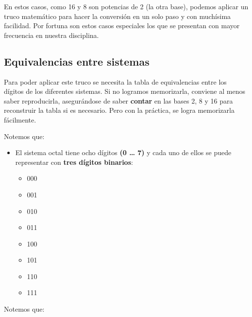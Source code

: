 \documentclass[spanish,a4paper,]{article}
\providecommand{\tightlist}{%
  \setlength{\itemsep}{0pt}\setlength{\parskip}{0pt}}
\begin{document}
En estos casos, como 16 y 8 son potencias de 2 (la otra base), podemos
aplicar un truco matemático para hacer la conversión en un solo paso y
con muchísima facilidad. Por fortuna son estos casos especiales los que
se presentan con mayor frecuencia en nuestra disciplina.

\hypertarget{equivalencias-entre-sistemas}{%
\subsection{Equivalencias entre
sistemas}\label{equivalencias-entre-sistemas}}

Para poder aplicar este truco se necesita la tabla de equivalencias
entre los dígitos de los diferentes sistemas. Si no logramos
memorizarla, conviene al menos saber reproducirla, asegurándose de saber
\textbf{contar} en las bases 2, 8 y 16 para reconstruir la tabla si es
necesario. Pero con la práctica, se logra memorizarla fácilmente.

Notemos que:

\begin{itemize}
\tightlist
\item
  El sistema octal tiene ocho dígitos \textbf{(0 \ldots{} 7)} y cada uno
  de ellos se puede representar con \textbf{tres dígitos binarios}:

  \begin{itemize}
  \tightlist
  \item
    000
  \item
    001
  \item
    010
  \item
    011
  \item
    100
  \item
    101
  \item
    110
  \item
    111
  \end{itemize}
\end{itemize}

Notemos que:
\end{document}
